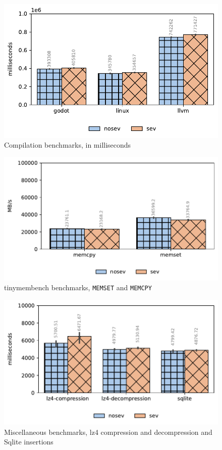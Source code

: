 \documentclass[twocolumn]{article}
\begin{document}
\begin{figure}[ht]
    \centering
    \includegraphics[width=\columnwidth]{img/compilation-benchmark.pdf}
    \caption{Compilation benchmarks, in milliseconds}
    \label{fig:tb-compilation}
\end{figure}

\begin{figure}[ht]
    \centering
    \includegraphics[width=\columnwidth]{img/tinymembenchmark.pdf}
    \caption{tinymembench benchmarks, \texttt{MEMSET} and \texttt{MEMCPY}}
    \label{fig:tb-tinymembench}
\end{figure}

\begin{figure}[ht]
    \centering
    \includegraphics[width=\columnwidth]{img/misc.pdf}
    \caption{Miscellaneous benchmarks, lz4 compression and decompression and Sqlite insertions}
    \label{fig:tb-misc}
\end{figure}
\end{document}
